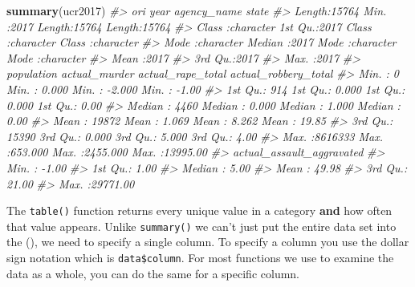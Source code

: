 \documentclass[
  12pt,
]{book}
\newenvironment{Shaded}{\begin{snugshade}}{\end{snugshade}}
\newcommand{\CommentTok}[1]{\textcolor[rgb]{0.56,0.35,0.01}{\textit{#1}}}
\newcommand{\KeywordTok}[1]{\textcolor[rgb]{0.13,0.29,0.53}{\textbf{#1}}}
\newcommand{\NormalTok}[1]{#1}
\newcommand{\OperatorTok}[1]{\textcolor[rgb]{0.81,0.36,0.00}{\textbf{#1}}}
\begin{document}
\begin{Shaded}
\begin{Highlighting}[]
\KeywordTok{summary}\NormalTok{(ucr2017)}
\CommentTok{\#>      ori                 year      agency\_name           state          }
\CommentTok{\#>  Length:15764       Min.   :2017   Length:15764       Length:15764      }
\CommentTok{\#>  Class :character   1st Qu.:2017   Class :character   Class :character  }
\CommentTok{\#>  Mode  :character   Median :2017   Mode  :character   Mode  :character  }
\CommentTok{\#>                     Mean   :2017                                        }
\CommentTok{\#>                     3rd Qu.:2017                                        }
\CommentTok{\#>                     Max.   :2017                                        }
\CommentTok{\#>    population      actual\_murder     actual\_rape\_total  actual\_robbery\_total}
\CommentTok{\#>  Min.   :      0   Min.   :  0.000   Min.   :  {-}2.000   Min.   :   {-}1.00    }
\CommentTok{\#>  1st Qu.:    914   1st Qu.:  0.000   1st Qu.:   0.000   1st Qu.:    0.00    }
\CommentTok{\#>  Median :   4460   Median :  0.000   Median :   1.000   Median :    0.00    }
\CommentTok{\#>  Mean   :  19872   Mean   :  1.069   Mean   :   8.262   Mean   :   19.85    }
\CommentTok{\#>  3rd Qu.:  15390   3rd Qu.:  0.000   3rd Qu.:   5.000   3rd Qu.:    4.00    }
\CommentTok{\#>  Max.   :8616333   Max.   :653.000   Max.   :2455.000   Max.   :13995.00    }
\CommentTok{\#>  actual\_assault\_aggravated}
\CommentTok{\#>  Min.   :   {-}1.00         }
\CommentTok{\#>  1st Qu.:    1.00         }
\CommentTok{\#>  Median :    5.00         }
\CommentTok{\#>  Mean   :   49.98         }
\CommentTok{\#>  3rd Qu.:   21.00         }
\CommentTok{\#>  Max.   :29771.00}
\end{Highlighting}
\end{Shaded}

The \texttt{table()} function returns every unique value in a category \textbf{and} how often that value appears. Unlike \texttt{summary()} we can't just put the entire data set into the (), we need to specify a single column. To specify a column you use the dollar sign notation which is \texttt{data\$column}. For most functions we use to examine the data as a whole, you can do the same for a specific column.

\begin{Shaded}
\end{Shaded}
\end{document}
